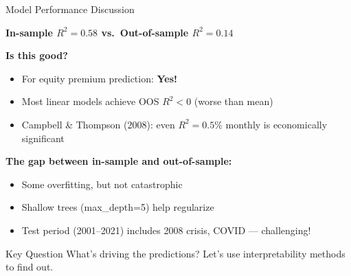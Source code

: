 \documentclass[10pt]{beamer}
\newcommand{\highlight}[1]{\textcolor{AccentOrange}{\textbf{#1}}}
\begin{document}
\begin{frame}{Model Performance Discussion}

  \textbf{In-sample $R^2 = 0.58$ vs.\ Out-of-sample $R^2 = 0.14$}

  \vspace{0.5em}
  \textbf{Is this good?}
  \begin{itemize}
    \item For equity premium prediction: \highlight{Yes!}
    \item Most linear models achieve OOS $R^2 < 0$ (worse than mean)
    \item Campbell \& Thompson (2008): even $R^2 = 0.5\%$ monthly is economically significant
  \end{itemize}

  \vspace{0.5em}
  \textbf{The gap between in-sample and out-of-sample:}
  \begin{itemize}
    \item Some overfitting, but not catastrophic
    \item Shallow trees (max\_depth=5) help regularize
    \item Test period (2001--2021) includes 2008 crisis, COVID --- challenging!
  \end{itemize}

  \vspace{0.5em}
  \begin{block}{Key Question}
    What's driving the predictions? Let's use interpretability methods to find out.
  \end{block}
\end{frame}

\end{document}
